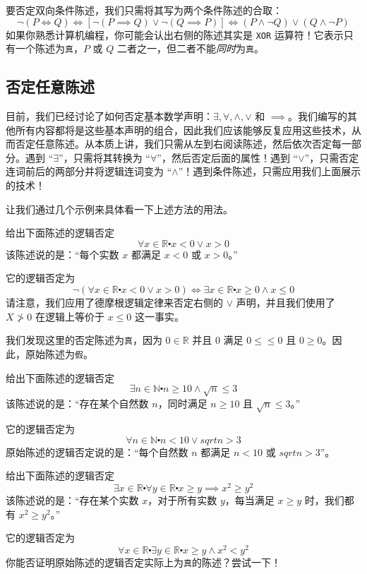要否定双向条件陈述，我们只需将其写为两个条件陈述的合取：
\[\neg (P \iff Q) \iff [\neg (P \implies Q) \lor \neg (Q \implies P)] \iff (P \land \neg Q) \lor (Q \land \neg P)\]
如果你熟悉计算机编程，你可能会认出右侧的陈述其实是 \verb|XOR| 运算符！它表示只有一个陈述为\verb|真|，$P$ 或 $Q$ 二者之一，但二者不能\emph{同时}为\verb|真|。

\subsection{否定任意陈述}

目前，我们已经讨论了如何否定基本数学声明：$\exists, \forall, \land , \lor$ 和 $\implies$。我们编写的其他所有内容都将是这些基本声明的组合，因此我们应该能够反复应用这些技术，从而否定任意陈述。从本质上讲，我们只需从左到右阅读陈述，然后依次否定每一部分。遇到 ``$\exists$''，只需将其转换为 ``$\forall$''，然后否定后面的属性！遇到 ``$\lor$''，只需否定连词前后的两部分并将逻辑连词变为 ``$\land$''！遇到条件陈述，只需应用我们上面展示的技术！

让我们通过几个示例来具体看一下上述方法的用法。\\

\begin{example}
    给出下面陈述的逻辑否定
    \[\forall x \in \mathbb{R} \centerdot x < 0 \lor x > 0\]
    该陈述说的是：``每个实数 $x$ 都满足 $x < 0$ 或 $x > 0$。''

    它的逻辑否定为
    \[\neg (\forall x \in \mathbb{R} \centerdot x < 0 \lor x > 0) \iff \exists x \in \mathbb{R} \centerdot x \ge 0 \land x \le 0\]
    请注意，我们应用了德摩根逻辑定律来否定右侧的 $\lor$ 声明，并且我们使用了 $X \ngtr 0$ 在逻辑上等价于 $x \le 0$ 这一事实。

    我们发现这里的否定陈述为\verb|真|，因为 $0 \in \mathbb{R}$ 并且 $0$ 满足 $0≤ \le 0$ 且 $0 \ge 0$。因此，原始陈述为\verb|假|。
\end{example}

\begin{example}
    给出下面陈述的逻辑否定
    \[\exists n \in \mathbb{N} \centerdot n \ge 10 \land \sqrt{n} \le 3\]
    该陈述说的是：``存在某个自然数 $n$，同时满足 $n \ge 10$ 且 $\sqrt{n} \le 3$。''

    它的逻辑否定为
    \[\forall n \in \mathbb{N} \centerdot n < 10 \lor sqrt{n} > 3\]
    原始陈述的逻辑否定说的是：``每个自然数 $n$ 都满足 $n < 10$ 或 $sqrt{n} > 3$''。
\end{example}

\begin{example}
    给出下面陈述的逻辑否定
    \[\exists x \in \mathbb{R} \centerdot \forall y \in \mathbb{R} \centerdot x \ge y \implies x^2 \ge y^2\]
    该陈述说的是：``存在某个实数 $x$，对于所有实数 $y$，每当满足 $x \ge y$ 时，我们都有 $x^2 \ge y^2$。''

    它的逻辑否定为
    \[\forall x \in \mathbb{R} \centerdot \exists y \in \mathbb{R} \centerdot x \ge y \land x^2 < y^2\]
    你能否证明原始陈述的逻辑否定实际上为\verb|真|的陈述？尝试一下！
\end{example}

